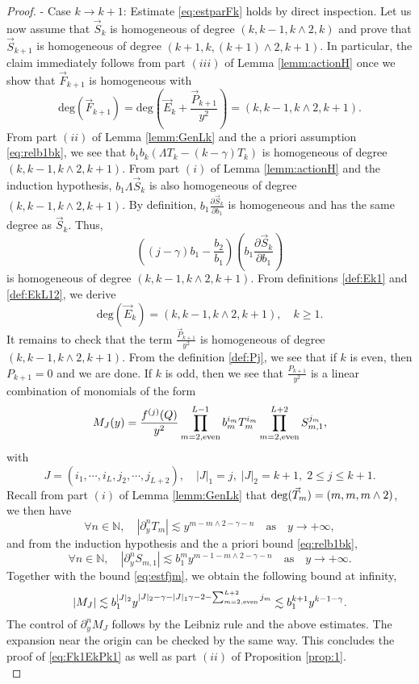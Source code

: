 \documentclass[11pt]{aims}
\theoremstyle{definition}
\numberwithin{equation}{section}
\begin{document}
\begin{proof}
\noindent - Case $k \to k+1$: Estimate \eqref{eq:estparFk} holds by direct inspection. Let us now assume that $\vec S_k$ is homogeneous of degree $(k, k-1, k\wedge2, k)$ and prove that $\vec S_{k + 1}$ is homogeneous of degree $(k+1, k, (k+1)\wedge2, k+1)$. In particular, the claim immediately follows from part $(iii)$ of Lemma \ref{lemm:actionH} once we show that $\vec F_{k+1}$ is homogeneous with
\begin{equation}\label{eq:Fk1EkPk1}
\text{deg}(\vec F_{k+1}) = \text{deg}\left(\vec E_k + \frac{\vec P_{k+1}}{y^2} \right) = (k, k-1, k\wedge2, k+1).
\end{equation}
From part $(ii)$ of Lemma \ref{lemm:GenLk} and the a priori assumption \eqref{eq:relb1bk}, we see that $b_1b_k(\Lambda T_k - (k - \gamma)T_k)$ is homogeneous of degree $(k, k-1, k\wedge2, k+1)$. From part $(i)$ of Lemma \ref{lemm:actionH} and the induction hypothesis, $b_1 \Lambda \vec S_k$ is also homogeneous of degree $(k, k-1, k\wedge2, k+1)$. By definition, $b_1\frac{\partial \vec S_k}{\partial b_1}$ is homogeneous and has the same degree as $\vec S_k$. Thus, 
$$\left((j - \gamma)b_1 - \frac{b_{2}}{b_{1}}\right)\left(b_1\frac{\partial \vec S_k}{\partial b_1}\right)$$
is homogeneous of degree $(k, k-1, k\wedge2, k+1)$. From definitions \eqref{def:Ek1} and \eqref{def:EkL12}, we derive  
$$\text{deg}(\vec E_k) = (k, k-1, k\wedge2, k+1), \quad k \geq 1.$$
It remains to check that the term $\frac{\vec P_{k+1}}{y^2}$ is homogeneous of degree $(k, k-1, k\wedge2, k+1)$. From the definition \eqref{def:Pj}, we see that if $k$ is even, then $P_{k+1} = 0$ and we are done. If $k$ is odd, then we see that $\frac{P_{k+1}}{y^2}$ is a linear combination of monomials of the form 
$$M_J(y) = \frac{f^{(j)}(Q)}{y^2}\prod_{m = 2, \textup{even}}^{L-1} b_m^{i_m}T_m^{i_m}\prod_{m = 2, \textup{even}}^{L+2}S_{m,1}^{j_m},$$
with 
$$J= (i_1, \cdots, i_L, j_2, \cdots, j_{L+2}), \quad |J|_1 = j, \; |J|_2 = k+1, \; 2 \leq j \leq k+1.$$
Recall from part $(i)$ of Lemma \ref{lemm:GenLk} that $\textup{deg}(\vec T_m) = (m, m, m\wedge2)$, we then have
$$\forall n \in \mathbb{N}, \quad |\partial_y^n T_m| \lesssim y^{m - m\wedge2 - \gamma - n} \quad \text{as} \quad y \to +\infty,$$
and from the induction hypothesis and the a priori bound \eqref{eq:relb1bk},
$$\forall n \in \mathbb{N}, \quad |\partial_y^n S_{m,1}| \lesssim b_1^{m}y^{m -1  - m\wedge2 - \gamma - n} \quad \text{as} \quad y \to +\infty. $$
Together with the bound \eqref{eq:estfjm}, we obtain the following bound at infinity,
$$| M_J|\lesssim b_1^{|J|_2} y^{|J|_2 - \gamma - |J|_1 \gamma - 2 - \sum_{m=2, \textup{even}}^{L+2}j_m} \lesssim b_1^{k+1}y^{k-1 - \gamma}.$$
The control of $\partial_y^n M_J$ follows by the Leibniz rule and the above estimates. The expansion near the origin can be checked by the same way. This concludes the proof of \eqref{eq:Fk1EkPk1} as well as part $(ii)$ of Proposition \ref{prop:1}.\\


\end{proof}
\end{document}
